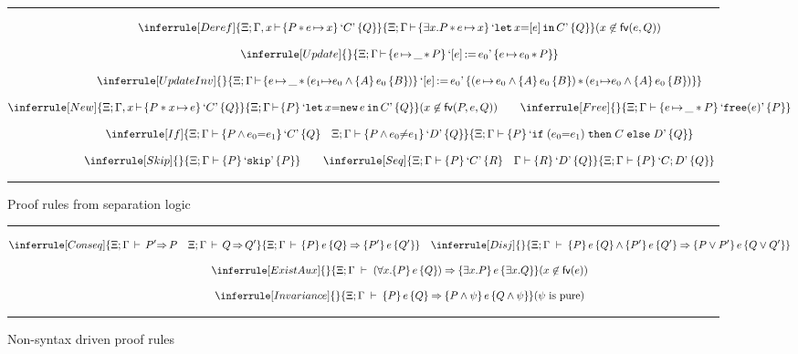 \documentclass{LMCS}
\theoremstyle{remark}
\newcommand{\QUOTE}[1]{\textnormal{`\ensuremath{#1}'}}
\newcommand{\SYN}[1]{\ensuremath{\texttt{#1}}}
\newcommand{\fvar}{\ensuremath{\mathsf{fv}}}
\newcommand{\triple}[3]{{\ensuremath{\!\left.\{ #1 \}\, #2\, \{  #3 \}\!\right.}}}
\newcommand{\X}{\ensuremath{\Xi}}
\begin{document}
\begin{figure*}[!t]
\hrule
\begin{gather*}
\inferrule[Deref]{
  \X;\Gamma,x\,{\adash}\,\triple{P\,{*}\,e\,{\mapsto}\,x}{\QUOTE{C}}{Q}
}{
  \X;\Gamma\,{\adash}\, \triple{\exists x.P\,{*}\,e\,{\mapsto}\,x}{\QUOTE{\SYN{let}\,{x{=}[e]}\,\SYN{in}\,{C}}}{Q}
}(x \not\in \fvar(e,Q))
\\[2ex] 
\inferrule[Update]{
}{
  \X;\Gamma\,{\adash}\,\triple{e\,{\mapsto}\,\_ \,{*}\, P}{\QUOTE{[e] \,{:=}\, e_0}}{e\,{\mapsto}\,e_0 \,{*}\, P}
} \\[2ex] 
\inferrule[UpdateInv]{
}{
  \X;\Gamma\,{\adash}\,\triple{e\,{\mapsto}\,\_ \,{*}\, (e_1{\mapsto}e_0 \wedge  \triple{A}{e_0}{B})}{\QUOTE{[e] \,{:=}\, e_0}}{(e\,{\mapsto}\,e_0\wedge  \triple{A}{e_0}{B}) \,{*}\, (e_1{\mapsto}e_0 \wedge \triple{A}{e_0}{B}) }
}
\\[2ex]
\inferrule[New]{
  \X;\Gamma,x \,{\adash}\, \triple{P*x\,{\mapsto}\,e}{\QUOTE{C}}{Q}
}{
  \X;\Gamma \,{\adash}\, \triple{P}{\QUOTE{\SYN{let}\,{x {=} \SYN{new}\,e}\,\SYN{in}\,{C}}}{Q}
}(x \not\in \fvar(P,e,Q))
\qquad
\inferrule[Free]{
}{
  \X;\Gamma\adash\triple{e\,{\mapsto}\,\_ * P}{\QUOTE{\SYN{free}(e)}}{P}
}
\\[2ex]
\inferrule[If]{
  \X;\Gamma\adash \triple{P \,{\wedge}\, e_0{=}e_1}{\QUOTE{C}}{Q} \quad \X;\Gamma\adash \triple{P \,{\wedge}\, e_0{\not=}e_1}{\QUOTE{D}}{Q}
}{
  \X;\Gamma\adash \triple{P}{\QUOTE{\SYN{if}\;(e_0{=}e_1)\;\SYN{then}\;C\;\SYN{else}\;D}}{Q}
}
\\[2ex]
\inferrule[Skip]{
}{
  \X;\Gamma\adash\triple{P}{\QUOTE{\SYN{skip}}}{P}
}
\qquad
\inferrule[Seq]{
  \X;\Gamma\adash \triple{P}{\QUOTE{C}}{R} \quad \Gamma\adash \triple{R}{\QUOTE{D}}{Q}
}{
  \X;\Gamma\adash \triple{P}{\QUOTE{C;D}}{Q}
}
\end{gather*}
\hrule
\caption{Proof rules from separation logic}
\label{fig:SLRules}
\end{figure*}

\begin{figure*}[!t]
\hrule
\begin{gather*}
\inferrule[Conseq]{
  \X;\Gamma \,\adash\, P'{\Rightarrow}\,P 
  \quad \X;\Gamma \,\adash\, Q\,{\Rightarrow}\,Q'
}{
  \X;\Gamma \,\adash\, {\triple{P}{e}{Q}} \Rightarrow {\triple{P'}{e}{Q'}}
}
\quad
\inferrule[Disj]{
}{
  \X;\Gamma \;\adash\;
  \triple{P}{e}{Q}\wedge{\triple{P'}{e}{Q'}} \Rightarrow \triple{P\vee P'}{e}{Q\vee Q'}
}
\\[2ex]
\inferrule[ExistAux]{
}{
  \X;\Gamma \;\adash\; (\forall x.\triple{P}{e}{Q})\Rightarrow\triple{\exists x.P}{e}{\exists x.Q}
}(x \not\in \fvar(e))
\\[2ex]
\inferrule[Invariance]{
}{
 \X;\Gamma \;\adash\; \triple{P}{e}{Q}
 \Rightarrow
\triple{P\wedge \psi}{e}{Q \wedge \psi}
  }(\mbox{$\psi$ is pure})
\end{gather*}
\hrule
\caption{Non-syntax driven proof rules}
\label{fig:Nonsyntax:SLRules}
\end{figure*}
\end{document}
